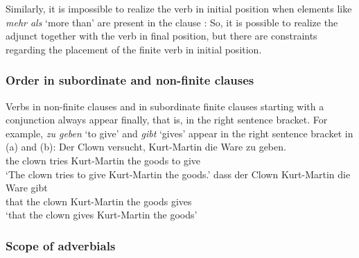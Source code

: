 Similarly, it is impossible to realize the verb in initial position when elements like
\emph{mehr als} `more than' are present in the clause \parencites[Section~3.1]{Haider97c}[]{Meinunger2001a}: 
\eal
{}
\zl
{}
So, it is possible to realize the adjunct together with the verb in final position, but there are
constraints regarding the placement of the finite verb in initial position.


\subsubsection{Order in subordinate and non-finite clauses}

Verbs in non-finite clauses and in subordinate finite clauses starting with a conjunction
  always appear finally, that is, in the right sentence bracket. For example, \emph{zu geben} `to
  give' and \emph{gibt} `gives' appear in the right sentence bracket in (a) and (b):
\eal
\ex 
\gll Der Clown versucht, Kurt-Martin die Ware zu geben.\\
     the clown tries     Kurt-Martin the goods to give\\
\glt `The clown tries to give Kurt-Martin the goods.'
\ex 
\gll dass der Clown Kurt-Martin die Ware gibt\\
     that the clown Kurt-Martin the goods gives\\
\glt `that the clown gives Kurt-Martin the goods'
\zl



\subsubsection{Scope of adverbials}


